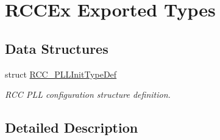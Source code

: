 \hypertarget{group___r_c_c_ex___exported___types}{}\section{R\+C\+C\+Ex Exported Types}
\label{group___r_c_c_ex___exported___types}
\subsection*{Data Structures}
\begin{DoxyCompactItemize}
\item 
struct \mbox{\hyperlink{struct_r_c_c___p_l_l_init_type_def}{R\+C\+C\+\_\+\+P\+L\+L\+Init\+Type\+Def}}
\begin{DoxyCompactList}\small\item\em R\+CC P\+LL configuration structure definition. \end{DoxyCompactList}\end{DoxyCompactItemize}


\subsection{Detailed Description}
